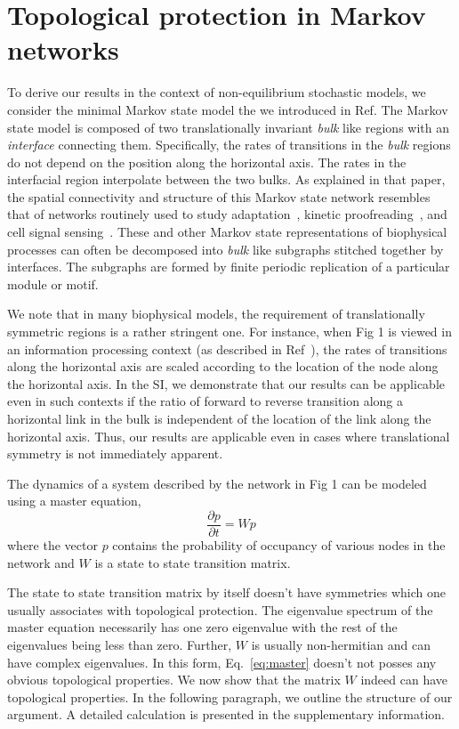 \documentclass[amsmath,preprintnumbers,10pt,twocolumn,prl]{revtex4-1}
\begin{document}
\section{Topological protection in Markov networks}
To derive our results in the context of non-equilibrium stochastic models, we consider the minimal Markov state model the we introduced in Ref. The Markov state model is composed of two translationally invariant \textit{bulk} like regions with an \textit{interface} connecting them. Specifically, the rates of transitions in the \textit{bulk} regions do not depend on the position along the horizontal axis. The rates in the interfacial region interpolate between the two bulks. As explained in that paper, the spatial connectivity and structure of this Markov state network resembles that of networks routinely used to study adaptation~\cite{Lan2012}, kinetic proofreading~\cite{Murugan2012}, and cell signal sensing~\cite{Mehta2012}. These and other Markov state representations of biophysical processes can often be decomposed into \textit{bulk} like subgraphs stitched together by interfaces. The subgraphs are formed by finite periodic replication of a particular module or motif. 

We note that in many biophysical models, the requirement of translationally symmetric regions is a rather stringent one. For instance, when Fig 1 is viewed in an information processing context (as described in Ref~\cite{Mehta2012}), the rates of transitions along the horizontal axis are scaled according to the location of the node along the horizontal axis. In the SI, we demonstrate that our results can be applicable even in such contexts if the ratio of forward to reverse transition along a horizontal link in the bulk is independent of the location of the link along the horizontal axis.  Thus, our results are applicable even in cases where translational symmetry is not immediately apparent. 


The dynamics of a system described by the network in Fig 1 can be modeled using a master equation, 
\begin{equation}
\label{eq:master}
\frac{\partial p}{\partial t}=W p 
\end{equation}
where the vector $p$ contains the probability of occupancy of various nodes in the network and $W$ is a state to state transition matrix. 

The state to state transition matrix by itself doesn't have symmetries which one usually associates with topological protection. The eigenvalue spectrum of the master equation necessarily has one zero eigenvalue with the rest of the eigenvalues being less than zero. Further, $W$ is usually non-hermitian and can have complex eigenvalues. In this form, Eq.~\ref{eq:master} doesn't not posses any obvious topological properties. We now show that the matrix $W$ indeed can have topological properties. In the following paragraph, we outline the structure of our argument. A detailed calculation is presented in the supplementary information. 
\end{document}
